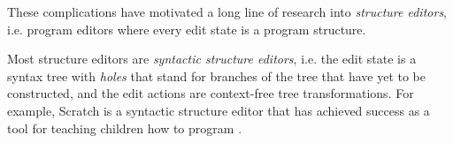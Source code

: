 

These complications have motivated a long line of research into \emph{structure editors}, i.e. program editors where every edit state is a program structure. %

Most structure editors are \emph{syntactic structure editors}, i.e. the edit state is a syntax tree with \emph{holes} that stand for branches of the tree that have yet to be constructed, and the edit actions are context-free tree transformations. For example, Scratch is a syntactic structure editor that has achieved success as a tool for teaching children how to program \cite{Resnick:2009:SP:1592761.1592779}. 

